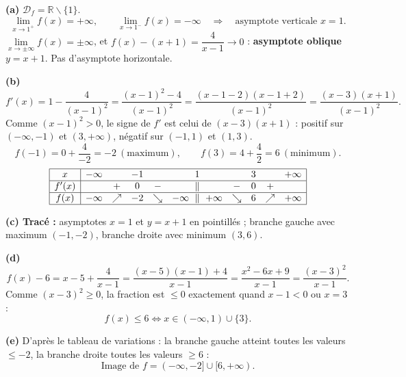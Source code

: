 \documentclass[11pt]{article}
\def\setminus{\mathbin{\backslash}}\let\smallsetminus\setminus
\begin{document}
\begin{corrige}
\textbf{(a)} $\mathcal{D}_f = \mathbb{R} \setminus \{1\}$.
\[
\lim_{x \to 1^+} f(x) = +\infty, \qquad \lim_{x \to 1^-} f(x) = -\infty
\quad\Longrightarrow\quad \text{asymptote verticale } x = 1.
\]
$\lim\limits_{x\to\pm\infty} f(x) = \pm\infty$, et $f(x) - (x+1) = \dfrac{4}{x-1} \to 0$ : \textbf{asymptote oblique} $y = x + 1$. Pas d'asymptote horizontale.

\textbf{(b)}
\[
f'(x) = 1 - \frac{4}{(x-1)^2} = \frac{(x-1)^2 - 4}{(x-1)^2} = \frac{(x-1-2)(x-1+2)}{(x-1)^2} = \frac{(x-3)(x+1)}{(x-1)^2}.
\]
Comme $(x-1)^2 > 0$, le signe de $f'$ est celui de $(x-3)(x+1)$ : positif sur $(-\infty, -1)$ et $(3, +\infty)$, négatif sur $(-1, 1)$ et $(1, 3)$.
\[
f(-1) = 0 + \frac{4}{-2} = -2 \ (\text{maximum}), \qquad f(3) = 4 + \frac{4}{2} = 6 \ (\text{minimum}).
\]
\[
\begin{array}{|c|ccccccccc|}
\hline
x & -\infty & & -1 & & 1 & & 3 & & +\infty \\
\hline
f'(x) & & + & 0 & - & \parallel & - & 0 & + & \\
\hline
f(x) & -\infty & \nearrow & -2 & \searrow & -\infty\ \parallel\ +\infty & \searrow & 6 & \nearrow & +\infty \\
\hline
\end{array}
\]

\textbf{(c) Tracé :} asymptotes $x = 1$ et $y = x + 1$ en pointillés ; branche gauche avec maximum $(-1, -2)$, branche droite avec minimum $(3, 6)$.

\textbf{(d)}
\[
f(x) - 6 = x - 5 + \frac{4}{x-1} = \frac{(x-5)(x-1) + 4}{x-1} = \frac{x^2 - 6x + 9}{x-1} = \frac{(x-3)^2}{x-1}.
\]
Comme $(x-3)^2 \ge 0$, la fraction est $\le 0$ exactement quand $x - 1 < 0$ ou $x = 3$ :
\[
f(x) \le 6 \iff x \in (-\infty, 1) \cup \{3\}.
\]

\textbf{(e)} D'après le tableau de variations : la branche gauche atteint toutes les valeurs $\le -2$, la branche droite toutes les valeurs $\ge 6$ :
\[
\boxed{\text{Image de } f = (-\infty, -2] \cup [6, +\infty).}
\]
\end{corrige}
\end{document}
